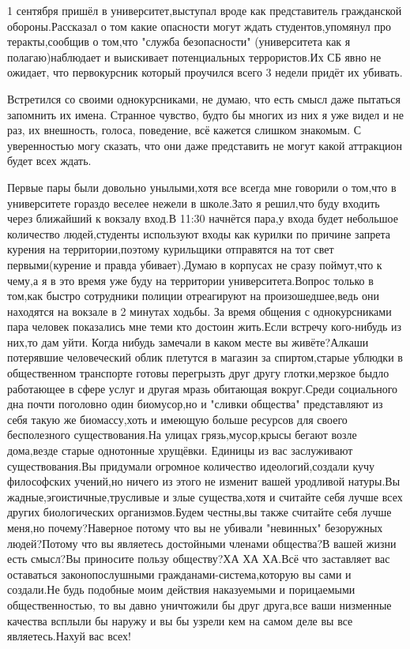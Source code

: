 \begin{itemize}
\begin{itemize}
1 сентября пришёл в университет,выступал вроде как представитель гражданской
обороны.Рассказал о том какие опасности могут ждать студентов,упомянул про
теракты,сообщив о том,что "служба безопасности" (университета как я
полагаю)наблюдает и выискивает потенциальных террористов.Их СБ явно не ожидает,
что первокурсник который проучился всего 3 недели придёт их убивать.

Встретился со своими однокурсниками, не думаю, что есть смысл даже пытаться
запомнить их имена. Странное чувство, будто бы многих из них я уже видел и не
раз, их внешность, голоса, поведение, всё кажется слишком знакомым. С уверенностью
могу сказать, что они даже представить не могут какой аттракцион будет всех
ждать.

Первые пары были довольно унылыми,хотя все всегда мне говорили о том,что в
университете гораздо веселее нежели в школе.Зато я решил,что буду входить через
ближайший к вокзалу вход.В 11:30 начнётся пара,у входа будет небольшое
количество людей,студенты используют входы как курилки по причине запрета
курения на территории,поэтому курильщики отправятся на тот свет первыми(курение
и правда убивает).Думаю в корпусах не сразу поймут,что к чему,а я в это время
уже буду на территории университета.Вопрос только в том,как быстро сотрудники
полиции отреагируют на произошедшее,ведь они находятся на вокзале в 2 минутах
ходьбы.  За время общения с однокурсниками пара человек показались мне теми кто
достоин жить.Если встречу кого-нибудь из них,то дам уйти.  Когда нибудь
замечали в каком месте вы живёте?Алкаши потерявшие человеческий облик плетутся
в магазин за спиртом,старые ублюдки в общественном транспорте готовы перегрызть
друг другу глотки,мерзкое быдло работающее в сфере услуг и другая мразь
обитающая вокруг.Среди социального дна почти поголовно один биомусор,но и
"сливки общества" представляют из себя такую же биомассу,хоть и имеющую больше
ресурсов для своего бесполезного существования.На улицах грязь,мусор,крысы
бегают возле дома,везде старые однотонные хрущёвки.  Единицы из вас заслуживают
существования.Вы придумали огромное количество идеологий,создали кучу
философских учений,но ничего из этого не изменит вашей уродливой натуры.Вы
жадные,эгоистичные,трусливые и злые существа,хотя и считайте себя лучше всех
других биологических организмов.Будем честны,вы также считайте себя лучше
меня,но почему?Наверное потому что вы не убивали "невинных" безоружных
людей?Потому что вы являетесь достойными членами общества?В вашей жизни есть
смысл?Вы приносите пользу обществу?ХА ХА ХА.Всё что заставляет вас оставаться
законопослушными гражданами-система,которую вы сами и создали.Не будь подобные
моим действия наказуемыми и порицаемыми общественностью, то вы давно уничтожили
бы друг друга,все ваши низменные качества всплыли бы наружу и вы бы узрели кем
на самом деле вы все являетесь.Нахуй вас всех!


\end{itemize}
\end{itemize}
